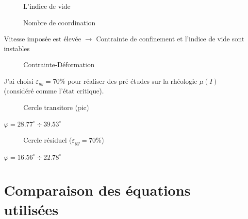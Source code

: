 \documentclass[a4paper,12pt]{report}
\begin{document}




                                \begin{figure}
                                    \centering
                                  \small
                                  
                                    \caption{L'indice de vide}
                                \end{figure}
                                    
                                \begin{figure}
                                   
                                    \caption{Nombre de coordination}
                                \end{figure}

                                Vitesse imposée est élevée $\rightarrow$ Contrainte de confinement et l'indice de vide sont instables

     
                                \begin{figure}
                                    
                                    \caption{Contrainte-Déformation}
                                \end{figure}
                                J'ai choisi $\varepsilon_{yy} = 70\%$ pour réaliser des pré-études sur la rhéologie $\mu(I)$ (considéré comme l'état critique). 


                                \begin{figure}
                                  
                                    \caption{Cercle transitore (pic)}
                                \end{figure}

                                    $\varphi = 28.77^\circ \div 39.53^\circ $


                                \begin{figure}
                                    
                                    \caption{Cercle résiduel ($\varepsilon_{yy} = 70\%$)}
                                \end{figure}
                                    $\varphi = 16.56^\circ \div 22.78^\circ $
                                    
\section{Comparaison des équations utilisées}
\end{document}
